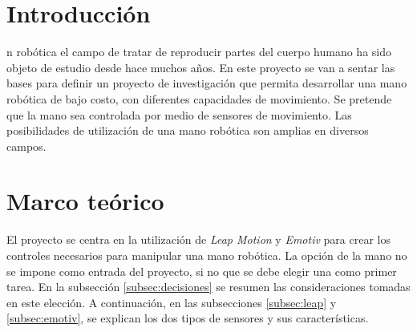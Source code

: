 \documentclass[letterpaper,journal,transmag]{IEEEtran}
\begin{document}
%
\IEEEpeerreviewmaketitle



\section{Introducción}
n robótica el campo de tratar de reproducir partes del
cuerpo humano ha sido objeto de estudio desde hace muchos años. En este proyecto
se van a sentar las bases para definir un proyecto de investigación que permita
desarrollar una mano robótica de bajo costo, con diferentes capacidades de
movimiento. Se pretende que la mano sea controlada por medio de sensores de
movimiento. Las posibilidades de utilización de una mano robótica son amplias en
diversos
campos.


\section{Marco teórico}

El proyecto se centra en la utilización de \emph{Leap Motion} y \emph{Emotiv}
para crear los controles necesarios para manipular una mano robótica. La opción
de la mano no se impone como entrada del proyecto, si no que se debe elegir una
como primer tarea. En la subsección \ref{subsec:decisiones} se resumen las
consideraciones tomadas en este elección. A continuación, en las subsecciones
\ref{subsec:leap} y \ref{subsec:emotiv}, se explican los dos tipos de sensores
y sus características.\\
\end{document}
